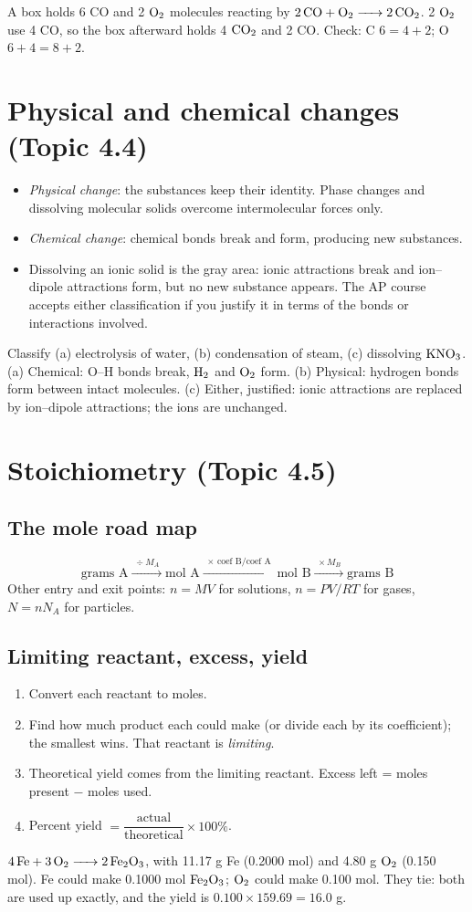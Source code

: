 \documentclass[11pt]{article}
\begin{document}
 A box holds 6 CO and 2 $\ce{O2}$ molecules reacting by $\ce{2CO + O2 -> 2CO2}$. 2 $\ce{O2}$ use 4 CO, so the box afterward holds 4 $\ce{CO2}$ and 2 CO. Check: C $6 = 4 + 2$; O $6 + 4 = 8 + 2$.

\section{Physical and chemical changes (Topic 4.4)}\label{t:4.4}
\begin{itemize}
\item \emph{Physical change}: the substances keep their identity. Phase changes and dissolving molecular solids overcome intermolecular forces only.
\item \emph{Chemical change}: chemical bonds break and form, producing new substances.
\item Dissolving an ionic solid is the gray area: ionic attractions break and ion--dipole attractions form, but no new substance appears. The AP course accepts either classification if you justify it in terms of the bonds or interactions involved.
\end{itemize}
 Classify (a) electrolysis of water, (b) condensation of steam, (c) dissolving $\ce{KNO3}$. (a) Chemical: O--H bonds break, $\ce{H2}$ and $\ce{O2}$ form. (b) Physical: hydrogen bonds form between intact molecules. (c) Either, justified: ionic attractions are replaced by ion--dipole attractions; the ions are unchanged.

\section{Stoichiometry (Topic 4.5)}\label{t:4.5}
\subsection{The mole road map}
\[ \text{grams A} \xrightarrow{\;\div M_A\;} \text{mol A} \xrightarrow{\;\times\,\text{coef B}/\text{coef A}\;} \text{mol B} \xrightarrow{\;\times M_B\;} \text{grams B} \]
Other entry and exit points: $n = MV$ for solutions, $n = PV/RT$ for gases, $N = nN_A$ for particles.
\subsection{Limiting reactant, excess, yield}
\begin{enumerate}
\item Convert each reactant to moles.
\item Find how much product each could make (or divide each by its coefficient); the smallest wins. That reactant is \emph{limiting}.
\item Theoretical yield comes from the limiting reactant. Excess left = moles present $-$ moles used.
\item Percent yield $= \dfrac{\text{actual}}{\text{theoretical}} \times 100\%$.
\end{enumerate}
 $\ce{4Fe + 3O2 -> 2Fe2O3}$, with 11.17 g Fe (0.2000 mol) and 4.80 g $\ce{O2}$ (0.150 mol). Fe could make 0.1000 mol $\ce{Fe2O3}$; $\ce{O2}$ could make 0.100 mol. They tie: both are used up exactly, and the yield is $0.100 \times 159.69 = 16.0$ g.
\end{document}
